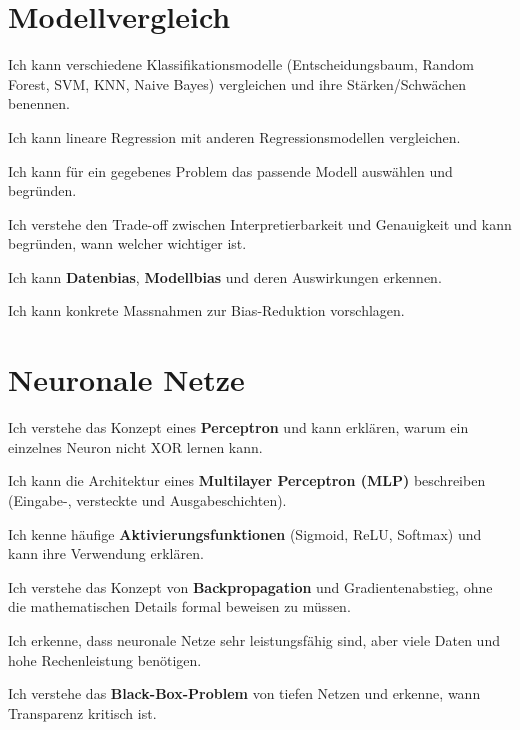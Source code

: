 \section{Modellvergleich}
\begin{todolist}
    \item Ich kann verschiedene Klassifikationsmodelle (Entscheidungsbaum, Random Forest, SVM, KNN, Naive Bayes) vergleichen und ihre Stärken/Schwächen benennen.
    \item Ich kann lineare Regression mit anderen Regressionsmodellen vergleichen.
    \item Ich kann für ein gegebenes Problem das passende Modell auswählen und begründen.
    \item Ich verstehe den Trade-off zwischen Interpretierbarkeit und Genauigkeit und kann begründen, wann welcher wichtiger ist.
    \item Ich kann \textbf{Datenbias}, \textbf{Modellbias} und deren Auswirkungen erkennen.
    \item Ich kann konkrete Massnahmen zur Bias-Reduktion vorschlagen.
\end{todolist}

\section{Neuronale Netze}
\begin{todolist}
    \item Ich verstehe das Konzept eines \textbf{Perceptron} und kann erklären, warum ein einzelnes Neuron nicht XOR lernen kann.
    \item Ich kann die Architektur eines \textbf{Multilayer Perceptron (MLP)} beschreiben (Eingabe-, versteckte und Ausgabeschichten).
    \item Ich kenne häufige \textbf{Aktivierungsfunktionen} (Sigmoid, ReLU, Softmax) und kann ihre Verwendung erklären.
    \item Ich verstehe das Konzept von \textbf{Backpropagation} und Gradientenabstieg, ohne die mathematischen Details formal beweisen zu müssen.
    \item Ich erkenne, dass neuronale Netze sehr leistungsfähig sind, aber viele Daten und hohe Rechenleistung benötigen.
    \item Ich verstehe das \textbf{Black-Box-Problem} von tiefen Netzen und erkenne, wann Transparenz kritisch ist.
\end{todolist}

